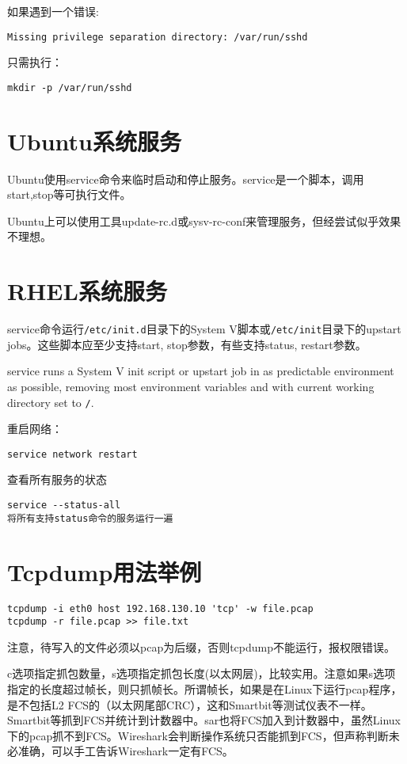 如果遇到一个错误:
\begin{verbatim}
Missing privilege separation directory: /var/run/sshd
\end{verbatim}

只需执行：
\begin{verbatim}
mkdir -p /var/run/sshd
\end{verbatim}




\section{Ubuntu系统服务}

Ubuntu使用service命令来临时启动和停止服务。service是一个脚本，调用start,stop等可执行文件。

Ubuntu上可以使用工具update-rc.d或sysv-rc-conf来管理服务，但经尝试似乎效果不理想。


\section{RHEL系统服务}
service命令运行\verb+/etc/init.d+目录下的System V脚本或\verb+/etc/init+目录下的upstart jobs。这些脚本应至少支持start, stop参数，有些支持status, restart参数。

service runs a System V init script or upstart job in as predictable environment as possible, removing most environment variables and with current working directory set to \verb+/+.  

重启网络：
\begin{verbatim}
service network restart
\end{verbatim}

查看所有服务的状态
\begin{verbatim}
service --status-all
将所有支持status命令的服务运行一遍
\end{verbatim}

\section{Tcpdump用法举例}

\begin{verbatim}
tcpdump -i eth0 host 192.168.130.10 'tcp' -w file.pcap
tcpdump -r file.pcap >> file.txt
\end{verbatim}
注意，待写入的文件必须以pcap为后缀，否则tcpdump不能运行，报权限错误。

c选项指定抓包数量，s选项指定抓包长度(以太网层)，比较实用。注意如果s选项指定的长度超过帧长，则只抓帧长。所谓帧长，如果是在Linux下运行pcap程序，是不包括L2 FCS的（以太网尾部CRC），这和Smartbit等测试仪表不一样。Smartbit等抓到FCS并统计到计数器中。sar也将FCS加入到计数器中，虽然Linux下的pcap抓不到FCS。Wireshark会判断操作系统只否能抓到FCS，但声称判断未必准确，可以手工告诉Wireshark一定有FCS。

